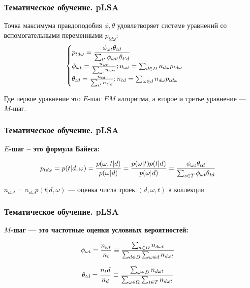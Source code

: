 \documentclass[notheorems, handout]{beamer}
\begin{document}
		\begin{frame}
	\frametitle{Тематическое обучение. pLSA}
	
Точка максимума правдоподобия $\phi, \theta$ удовлетворяет системе уравнений со вспомогательными переменными $p_{td\omega}$:
$$
\begin{cases}
\displaystyle
p_{td\omega}={ {\phi_{\omega t} \theta_{td} } \over { \sum_{t'} \phi_{\omega t'} \theta_{t'd}}}\\
\phi_{\omega t} = { {n_{\omega t}} \over {\sum_{\omega `} n_{\omega `t}}}; n_{\omega t} = \sum_{d \in D} n_{d\omega}p_{td\omega}\\
\theta_{td} = { {n_{td}} \over {\sum_{t'}n_{t'd}}}; n_{td} = \sum_{\omega \in d} n_{d\omega}p_{td\omega}
\end{cases}
$$

Где первое уравнение это $E$-шаг $EM$ алгоритма, а второе и третье уравнение --- $M$-шаг.

	\end{frame}
	
			\begin{frame}
	\frametitle{Тематическое обучение. pLSA}
	
\textbf{$E$-шаг -- это формула Байеса:}

$$p_{td\omega} = p(t | d, \omega) = { {p(\omega , t | d)} \over {p(\omega | d)}} = { {p(\omega | t) p(t|d)} \over {p(\omega | d)}}= {{\phi_{\omega t}\theta_{td}} \over {\sum_{s \in T}\phi_{\omega t}\theta_{td}}}$$

$n_{d \omega t} = n_{d \omega}p(t | d, \omega)$ --- оценка числа троек $(d, \omega, t)$ в коллекции
	\end{frame}

		\begin{frame}
	\frametitle{Тематическое обучение. pLSA}
	
\textbf{$M$-шаг --- это частотные оценки условных вероятностей:}

$$ \phi_{\omega t} = {{n_{\omega t}} \over {n_t}} \equiv {{\sum_{d \in D} n_{d \omega t}} \over {\sum_{d \in D} \sum_{\omega \in d} n_{d \omega t}}} $$

$$ \theta_{td} = { {n_td} \over {n_d}} \equiv {{\sum_{\omega \in D} n_{d \omega t}} \over {\sum_{\omega \in \Omega} \sum_{t \in T} n_{d \omega t}}}$$
	\end{frame}
	
\end{document}
